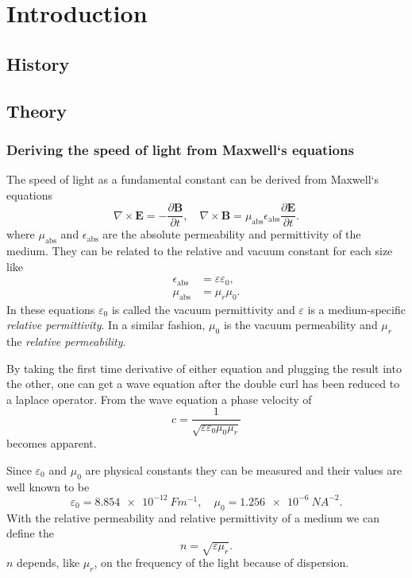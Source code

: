 \section{Introduction}
\label{sec:introduction}

\subsection{History}
\label{sec:history}

\subsection{Theory}
\label{sec:theory}

\subsubsection{Deriving the speed of light from Maxwell`s equations}
The speed of light as a fundamental constant can be derived from Maxwell`s equations
\cite{LabInstructions}
\begin{equation}
  \nabla \times \mathbf{E} = - \frac{\partial \mathbf{B}}{\partial t}, \quad
  \nabla \times \mathbf{B} = \mu_\text{abs} \epsilon_\text{abs} 
                              \frac{\partial \mathbf E}{\partial t} .
\end{equation}
where $\mu_\text{abs}$ and $\epsilon_\text{abs}$ are the absolute permeability and permittivity of
the medium. They can be related to the relative and vacuum constant for each size like
\begin{align}
  \epsilon_\text{abs} &= \varepsilon \varepsilon_0, \\
  \mu_\text{abs} &= \mu_r \mu_0.
\end{align}
In these equations $\varepsilon_0$ is called the vacuum permittivity and $\varepsilon$ is a
medium-specific \textit{relative permittivity}. In a similar fashion, $\mu_0$ is the vacuum
permeability and $\mu_r$ the \textit{relative permeability}.

By taking the first time derivative of either equation and plugging the result into the other, one
can get a wave equation after the double curl has been reduced to a laplace operator. From the wave
equation a phase velocity of
\begin{equation}
  c = \frac{1}{\sqrt{\varepsilon \varepsilon_0 \mu_0 \mu_r}}
\end{equation}
becomes apparent.

Since $\varepsilon_0$ and $\mu_0$ are physical constants they can be measured and their values are
well known to be \cite{muzero,epsilonzero}
\begin{equation}
  \varepsilon_0 = \SI{8.854e-12}{Fm^{-1}}, \quad
  \mu_0 = \SI{1.256e-6}{NA^{-2}}.
\end{equation}
With the relative permeability and relative permittivity of a medium we can define the
\[
  n = \sqrt{\varepsilon \mu_r}.
\]
$n$ depends, like $\mu_r$, on the frequency of the light because of dispersion.


